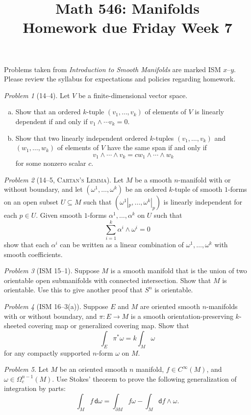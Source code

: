 \documentclass[11pt,twoside]{amsart}
\title{Math 546: Manifolds\\ Homework due Friday Week 7}
\theoremstyle{plain}
\theoremstyle{remark}
\newtheorem{prob}{Problem}
\theoremstyle{definition}
\theoremstyle{definition}
\newcommand{\dd}{\mathsf{d}}
\begin{document}
\maketitle

\noindent Problems taken from \emph{Introduction to Smooth Manifolds} are marked ISM $x$--$y$. Please review the syllabus for expectations and policies regarding homework.

\begin{prob}[14--4]
Let $V$ be a finite-dimensional vector space.
\begin{enumerate}[(a)]
\item Show that an ordered $k$-tuple $(v_1,\ldots,v_k)$ of elements of $V$ is linearly dependent if and only if $v_1\wedge\cdots v_k=0$.
\item Show that two linearly independent ordered $k$-tuples $(v_1,\ldots,v_k)$ and $(w_1,\ldots,w_k)$ of elements of $V$ have the same span if and only if
\[
  v_1\wedge\cdots\wedge v_k = cw_1\wedge\cdots\wedge w_k
\]
for some nonzero scalar $c$.
\end{enumerate}
\end{prob}

\begin{prob}[14--5, \textsc{Cartan's Lemma}]
Let $M$ be a smooth $n$-manifold with or without boundary, and let $(\omega^1,\ldots,\omega^k)$ be an ordered $k$-tuple of smooth $1$-forms on an open subset $U\subseteq M$ such that $(\omega^1|_p,\ldots,\omega^k|_p)$ is linearly independent for each $p\in U$. Given smooth $1$-forms $\alpha^1,\ldots,\alpha^k$ on $U$ such that
\[
  \sum_{i=1}^k \alpha^i\wedge \omega^i = 0
\]
show that each $\alpha^i$ can be written as a linear combination of $\omega^1,\ldots,\omega^k$ with smooth coefficients.
\end{prob}

\begin{prob}[ISM 15--1]
Suppose $M$ is a smooth manifold that is the union of two orientable open submanifolds with connected intersection. Show that $M$ is orientable. Use this to give another proof that $S^n$ is orientable.
\end{prob}

\begin{prob}[ISM 16--3(a)]
Suppose $E$ and $M$ are oriented smooth $n$-manifolds with or without boundary, and $\pi\colon E\to M$ is a smooth orientation-preserving $k$-sheeted covering map or generalized covering map. Show that
\[
  \int_E \pi^*\omega = k\int_M \omega
\]
for any compactly supported $n$-form $\omega$ on $M$.
\end{prob}

\begin{prob}
Let $M$ be an oriented smooth $n$ manifold, $f\in C^\infty(M)$, and $\omega\in \Omega^{n-1}_c(M)$. Use Stokes' theorem to prove the following generalization of integration by parts:
\[
  \int_M f\, \dd\omega = \int_{\partial M}f\omega - \int_M \dd f\wedge \omega.
\]
\end{prob}
\end{document}
